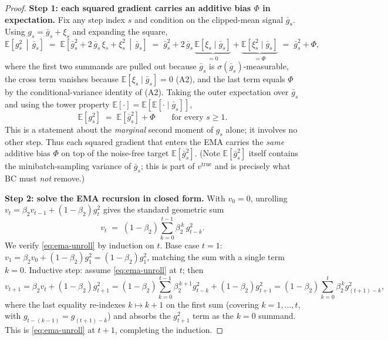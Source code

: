 \begin{proof}
\medskip
\noindent\textbf{Step 1: each squared gradient carries an additive bias $\Phi$ in expectation.}
Fix any step index $s$ and condition on the clipped-mean signal $\bar g_s$. Using
$g_s = \bar g_s + \xi_s$ and expanding the square,
\[
  \mathbb E\!\left[g_s^2 \,\middle|\, \bar g_s\right]
  \;=\; \mathbb E\!\left[\bar g_s^2 + 2\,\bar g_s\,\xi_s + \xi_s^2 \,\middle|\, \bar g_s\right]
  \;=\; \bar g_s^2 + 2\,\bar g_s\,\underbrace{\mathbb E[\xi_s\mid\bar g_s]}_{=0} + \underbrace{\mathbb E[\xi_s^2\mid\bar g_s]}_{=\Phi}
  \;=\; \bar g_s^2 + \Phi,
\]
where the first two summands are pulled out because $\bar g_s$ is $\sigma(\bar g_s)$-measurable,
the cross term vanishes because $\mathbb E[\xi_s\mid\bar g_s]=0$ (A2), and the last term equals
$\Phi$ by the conditional-variance identity of (A2). Taking the outer expectation over
$\bar g_s$ and using the tower property $\mathbb E[\cdot]=\mathbb E[\mathbb E[\cdot\mid\bar g_s]]$,
\begin{equation}
\label{eq:gsq-bias}
  \mathbb E[g_s^2] \;=\; \mathbb E[\bar g_s^2] + \Phi
  \qquad\text{for every }s\ge 1.
\end{equation}
This is a statement about the \emph{marginal} second moment of $g_s$ alone; it involves no
other step. Thus each squared gradient that enters the EMA carries the \emph{same} additive
bias $\Phi$ on top of the noise-free target $\mathbb E[\bar g_s^2]$. (Note $\mathbb E[\bar g_s^2]$
itself contains the minibatch-sampling variance of $\bar g_s$; this is part of $v^{\mathrm{true}}$
and is precisely what BC must \emph{not} remove.)

\medskip
\noindent\textbf{Step 2: solve the EMA recursion in closed form.}
With $v_0=0$, unrolling $v_t=\beta_2 v_{t-1}+(1-\beta_2)g_t^2$ gives the standard geometric
sum
\begin{equation}
\label{eq:ema-unroll}
  v_t \;=\; (1-\beta_2)\sum_{k=0}^{t-1}\beta_2^{\,k}\, g_{t-k}^2 .
\end{equation}
We verify \eqref{eq:ema-unroll} by induction on $t$. Base case $t=1$:
$v_1=\beta_2 v_0+(1-\beta_2)g_1^2=(1-\beta_2)g_1^2$, matching the sum with a single term
$k=0$. Inductive step: assume \eqref{eq:ema-unroll} at $t$; then
\[
  v_{t+1}=\beta_2 v_t+(1-\beta_2)g_{t+1}^2
  =(1-\beta_2)\sum_{k=0}^{t-1}\beta_2^{\,k+1} g_{t-k}^2+(1-\beta_2)g_{t+1}^2
  =(1-\beta_2)\sum_{k=0}^{t}\beta_2^{\,k} g_{(t+1)-k}^2,
\]
where the last equality re-indexes $k\mapsto k+1$ on the first sum (covering $k=1,\dots,t$, with
$g_{t-(k-1)}=g_{(t+1)-k}$) and absorbs the $g_{t+1}^2$ term as the $k=0$ summand. This is
\eqref{eq:ema-unroll} at $t+1$, completing the induction.


\end{proof}
